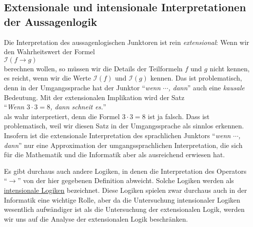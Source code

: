 \subsection{Extensionale und intensionale Interpretationen der Aussagenlogik}
Die Interpretation des aussagenlogischen Junktoren ist rein \emph{\color{blue}extensional}:
Wenn wir den Wahrheitswert der Formel
\\[0.2cm]
\hspace*{1.3cm}
$\mathcal{I}(f \rightarrow g)$ 
\\[0.2cm]
berechnen wollen, so m\"{u}ssen wir die Details der Teilformeln $f$ und $g$ nicht kennen, es reicht,
wenn wir die Werte $\mathcal{I}(f)$ und $\mathcal{I}(g)$ kennen.   Das ist problematisch,
denn in der Umgangssprache hat der Junktor
``\textsl{wenn $\cdots$, dann}'' auch eine \emph{\color{blue}kausale} Bedeutung.  Mit der extensionalen
Implikation wird der Satz
\\[0.2cm]
\hspace*{1.3cm}
``\textsl{Wenn $3 \cdot 3 = 8$, dann schneit es.}''
\\[0.2cm]
als wahr interpretiert, denn die Formel $3 \cdot 3 = 8$ ist ja falsch.  Dass ist problematisch, weil wir diesen Satz in der Umgangssprache 
als sinnlos erkennen.  Insofern ist die extensionale Interpretation des sprachlichen Junktors
``\textsl{wenn $\cdots$, dann}'' nur eine Approximation der umgangssprachlichen Interpretation, die sich f\"{u}r die
Mathematik und die Informatik aber als ausreichend erwiesen hat.

Es gibt durchaus auch andere Logiken, in denen die Interpretation des Operators ``$\rightarrow$'' von der
hier gegebenen Definition abweicht.  Solche Logiken werden als
\href{https://en.wikipedia.org/wiki/Intensional_logic}{intensionale Logiken} bezeichnet.  Diese Logiken spielen
zwar durchaus auch in der Informatik eine wichtige Rolle, aber da die Untersuchung intensionaler Logiken wesentlich
aufw\"andiger ist als die Untersuchung der extensionalen Logik, werden wir uns auf die Analyse der
extensionalen Logik beschr\"anken.   

